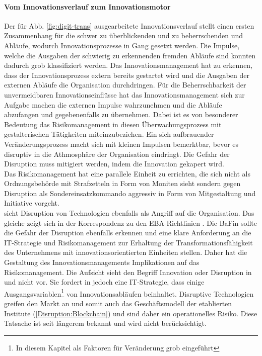  \paragraph{Vom Innovationsverlauf zum Innovationsmotor}
Der für Abb. \ref{fig:digit-trans} ausgearbeitete Innovationsverlauf stellt einen ersten Zusammenhang für die schwer zu überblickenden und zu beherrschenden und Abläufe, wodurch Innovationsprozesse in Gang gesetzt werden. Die Impulse, welche die Ausgaben der schwierig zu erkennenden fremden Abläufe sind konnten dadurch grob klassifiziert werden. Das Innovationsmanagement hat zu erkennen, dass der Innovationsprozess extern bereits gestartet wird und die Ausgaben der externen Abläufe die Organisation durchdringen. Für die Beherrschbarkeit der unvermeidbaren Innovationseinflüsse hat das Innovationsmanagement sich zur Aufgabe machen die externen Impulse wahrzunehmen und die Abläufe abzufangen und gegebenenfalls zu übernehmen.
Dabei ist es von besonderer Bedeutung das Risikomanagement in diesen Überwachungsprozess mit gestalterischen Tätigkeiten miteinzubeziehen. Ein sich aufbrauender Veränderungsprozess macht sich mit kleinen Impulsen bemerktbar, bevor es disruptiv in die Athmosphäre der Organisation eindringt. Die Gefahr der Disruption muss mitigiert werden, indem die Innovation gekapert wird. 
\medskip
\\
Das Risikomanagement hat eine parallele Einheit zu errichten, die sich nicht als Ordnungsbehörde mit Strafzetteln in Form von Moniten sieht sondern gegen Disruption als Sondereinsatzkommando aggressiv in Form von Mitgestaltung und Initiative vorgeht.
\medskip
\\
\citet{Fernandez:2020} sieht Disruption von Technologien ebenfalls als Angriff auf die Organisation. Das gleiche zeigt sich in der Korrespondenz zu den EBA-Richtlinien \cite{eba:2019}. Die \ac{BaFin} sollte die Gefahr der Disruption ebenfalls erkennen und eine klare Anforderung an die IT-Strategie und Risikomanagement zur Erhaltung der Transformationsfähigkeit des Unternehmens mit innovationsorientierten Einheiten stellen.
Daher hat die Gestaltung des Innovationsmanagements Implikationen auf das Risikomanagement. Die Aufsicht sieht den Begriff Innovation oder Disruption in \cite{MaRisk:2017} und \cite{BAIT:2018} nicht vor. Sie fordert in \cite{BAIT:2018} jedoch eine IT-Strategie, dass einige Ausgangsvariablen\footnote{In diesem Kapitel als Faktoren für Veränderung grob eingeführt} von Innovationsabläufen beinhaltet. 
Disruptive Technologien greifen den Markt an \cite{Fernandez:2020} und somit auch das Geschäftsmodell der etablierten Institute (\ref{Disruption:Blockchain}) und sind daher ein operationelles Risiko. Diese Tatsache ist seit längerem bekannt \cite{Ganswindt2006} und wird nicht berücksichtigt.
